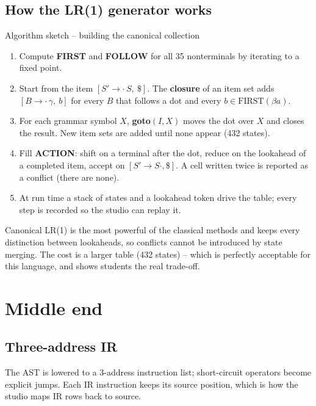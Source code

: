 \documentclass[11pt,a4paper]{article}
\begin{document}
\subsection{How the LR(1) generator works}
\begin{inout}{Algorithm sketch -- building the canonical collection}
\begin{enumerate}[label=\textbf{\arabic*.},itemsep=1pt]
\item Compute \textbf{FIRST} and \textbf{FOLLOW} for all 35 nonterminals by iterating to a fixed point.
\item Start from the item $[S' \to \cdot\, S,\ \$]$. The \textbf{closure} of an item set adds $[B \to \cdot\,\gamma,\ b]$ for every $B$ that follows a dot and every $b \in \mathrm{FIRST}(\beta a)$.
\item For each grammar symbol $X$, \textbf{goto}$(I,X)$ moves the dot over $X$ and closes the result. New item sets are added until none appear (432 states).
\item Fill \textbf{ACTION}: shift on a terminal after the dot, reduce on the lookahead of a completed item, accept on $[S'\to S\cdot,\$]$. A cell written twice is reported as a conflict (there are none).
\item At run time a stack of states and a lookahead token drive the table; every step is recorded so the studio can replay it.
\end{enumerate}
\end{inout}
\begin{aim}
Canonical LR(1) is the most powerful of the classical methods and keeps every distinction between lookaheads, so conflicts cannot be introduced by state merging. The cost is a larger table (432 states) -- which is perfectly acceptable for this language, and shows students the real trade-off.
\end{aim}

\section{Middle end}
\subsection{Three-address IR}
The AST is lowered to a 3-address instruction list; short-circuit operators become explicit jumps. Each IR instruction keeps its source position, which is how the studio maps IR rows back to source.
\end{document}
